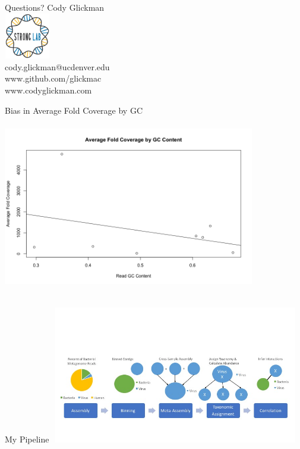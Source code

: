 \documentclass[11pt]{beamer}
\begin{document}
	
	\begin{frame}{Questions?}
	\center
	Cody Glickman \\ \includegraphics[height=2cm, width=2cm]{lablogo.png} \\ cody.glickman@ucdenver.edu \\ \alert{www.github.com/glickmac} \\ www.codyglickman.com
	\end{frame}
	
	
	\begin{frame}{Bias in Average Fold Coverage by GC}
	\includegraphics[height=8cm, width=11cm]{Viral_Coverage_by_GC.png}
	\end{frame}
	
	
	\begin{frame}{My Pipeline}
	\vspace{-1cm}
	\includegraphics[height=6cm, width=11cm]{figure_2_updated.jpg}
	\end{frame}
	
\end{document}
